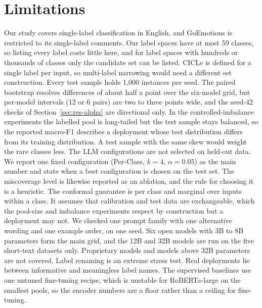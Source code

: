 \section*{Limitations}
\label{sec:limitations}

Our study covers single-label classification in English, and GoEmotions is restricted to its single-label comments. Our label spaces have at most 59 classes, so listing every label costs little here, and for label spaces with hundreds or thousands of classes only the candidate set can be listed. CICLe is defined for a single label per input, so multi-label narrowing would need a different set construction.
Every test sample holds 1,000 instances per seed. The paired bootstrap resolves differences of about half a point over the six-model grid, but per-model intervals (12 or 6 pairs) are two to three points wide, and the seed-42 checks of Section~\ref{sec:res-alpha} are directional only.
In the controlled-imbalance experiments the labelled pool is long-tailed but the test sample stays balanced, so the reported macro-F1 describes a deployment whose test distribution differs from its training distribution. A test sample with the same skew would weight the rare classes less.
The LLM configurations are not selected on held-out data. We report one fixed configuration (Per-Class, $k=4$, $\alpha=0.05$) as the main number and state when a best configuration is chosen on the test set. The miscoverage level is likewise reported as an ablation, and the rule for choosing it is a heuristic.
The conformal guarantee is per class and marginal over inputs within a class. It assumes that calibration and test data are exchangeable, which the pool-size and imbalance experiments respect by construction but a deployment may not.
We checked one prompt family with one alternative wording and one example order, on one seed. Six open models with 3B to 8B parameters form the main grid, and the 12B and 32B models are run on the five short-text datasets only. %
 Proprietary models and models above 32B parameters are not covered.
Label renaming is an extreme stress test. Real deployments lie between informative and meaningless label names.
The supervised baselines use one untuned fine-tuning recipe, which is unstable for RoBERTa-large on the smallest pools, so the encoder numbers are a floor rather than a ceiling for fine-tuning. %
